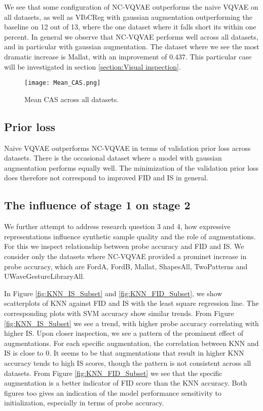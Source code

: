 \documentclass[../../thesis.tex]{subfiles}
\begin{document}
We see that some configuration of NC-VQVAE outperforms the naive VQVAE on all datasets, as well as VIbCReg with gaussian augmentation outperforming the baseline on 12 out of 13, where the one dataset where it falls short its within one percent. In general we observe that NC-VQVAE performs well across all datasets, and in particular with gaussian augmentation. The dataset where we see the most dramatic increase is Mallat, with an improvement of $0.437$. This particular case will be investigated in section \ref{section:Visual inspection}.  

\begin{figure}[h]
    \texttt{[image: Mean\_CAS.png]}
    \centering  
    \caption{Mean CAS across all datasets.}
    \label{fig:Mean_CAS}
\end{figure}





\subsection{Prior loss}

Naive VQVAE outperforms NC-VQVAE in terms of validation prior loss across datasets. There is the occasional dataset where a model with gaussian augmentation performs equally well. The minimization of the validation prior loss does therefore not correspond to improved FID and IS in general. 



\subsection{The influence of stage 1 on stage 2}

We further attempt to address research question 3 and 4, how expressive representations influence synthetic sample quality and the role of augmentations. For this we inspect relationship between probe accuracy and FID and IS. We consider only the datasets where NC-VQVAE provided a prominet increase in probe accuracy, which are FordA, FordB, Mallat, ShapesAll, TwoPatterns and UWaveGestureLibraryAll.\newline

In Figure \ref{fig:KNN_IS_Subset} and \ref{fig:KNN_FID_Subset}, we show scatterplots of KNN against FID and IS with the least square regression line. The corresponding plots with SVM accuracy show similar trends. From Figure \ref{fig:KNN_IS_Subset} we see a trend, with higher probe accuracy correlating with higher IS. Upon closer inspection, we see a pattern of the prominent effect of augmentations. For each specific augmentation, the correlation between KNN and IS is close to $0$. It seems to be that augmentations that result in higher KNN accuracy tends to high IS scores, though the pattern is not consistent across all datasets. From Figure \ref{fig:KNN_FID_Subset} we see that the specific augmentation is a better indicator of FID score than the KNN accuracy. Both figures too gives an indication of the model performance sensitivity to initialization, especially in terms of probe accuracy. 
\end{document}
